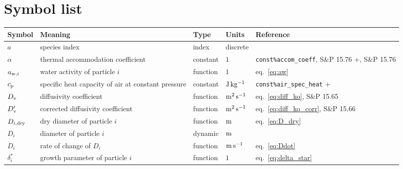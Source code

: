 \documentclass{article}
\begin{document}
\section{Symbol list}
\label{sec:symbol-list}

\newcommand{\rr}{\raggedright}
\newcommand{\tn}{\tabularnewline\hline}
\renewcommand{\arraystretch}{1.5}
\begin{longtable}{|l|p{5.5cm}|l|l|p{4.5cm}|}
\hline \textbf{Symbol} & \textbf{Meaning}                                                       & \textbf{Type} & \textbf{Units}                        &  \textbf{Reference}                                \tn
\hline \endhead
$a$                    & \rr species index                                                      & index         & discrete                              &                                                    \tn
$\alpha$               & \rr thermal accommodation coefficient                                  & constant      & $1$                                   & \rr \verb+const%accom_coeff+, S\&P 15.76           \tn
$a_{{\rm w},i}$        & \rr water activity of particle $i$                                     & function      & $1$                                   & \rr eq.~\ref{eq:aw}                                \tn
$c_{\rm p}$            & \rr specific heat capacity of air at constant pressure                 & constant      & $\rm J \, kg^{-1}$                    & \rr \verb+const%air_spec_heat+                     \tn
$D_{\rm v}$            & \rr diffusivity coefficient                                            & function      & $\rm m^2 \, s^{-1}$                   & \rr eq.~\ref{eq:diff_ko}, S\&P 15.65               \tn
$D_{\rm v}'$           & \rr corrected diffusivity coefficient                                  & function      & $\rm m^2 \, s^{-1}$                   & \rr eq.~\ref{eq:diff_ko_corr}, S\&P 15.66          \tn
$D_{i,\rm dry}$        & \rr dry diameter of particle $i$                                       & function      & $\rm m$                               & \rr eq.~\ref{eq:D_dry}                             \tn
$D_i$                  & \rr diameter of particle $i$                                           & dynamic       & $\rm m$                               & \rr                                                \tn
$\dot{D}_i$            & \rr rate of change of $D_i$                                            & function      & $\rm m \, s^{-1}$                     & \rr eq.~\ref{eq:Ddot}                              \tn
$\delta_i^*$           & \rr growth parameter of particle $i$                                   & function      & $1$                                   & \rr eq.~\ref{eq:delta_star}                        \tn

\end{longtable}
\end{document}
